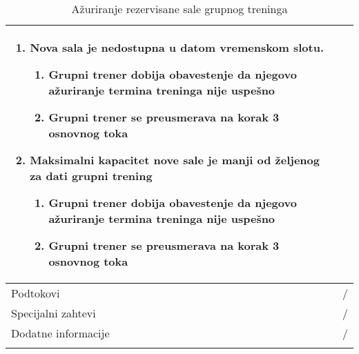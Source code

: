 \documentclass[../grupniTreninzi.tex]{subfiles}
\begin{document}
\begin{longtable}{| p{} | p{} |}
\begin{enumerate}
        \item Nova sala je nedostupna u datom vremenskom slotu. 
            \begin{enumerate}
                \item Grupni trener dobija obavestenje da njegovo ažuriranje termina treninga nije uspešno
                \item Grupni trener se preusmerava na korak 3 osnovnog toka
            \end{enumerate}
        \item Maksimalni kapacitet nove sale je manji od željenog za dati grupni trening
            \begin{enumerate}
                \item Grupni trener dobija obavestenje da njegovo ažuriranje termina treninga nije uspešno
                \item Grupni trener se preusmerava na korak 3 osnovnog toka
            \end{enumerate}
    \end{enumerate}\\
\hline
    Podtokovi & /\\
\hline
    Specijalni zahtevi & /\\
\hline
    Dodatne informacije & /\\
\hline
\caption{Ažuriranje rezervisane sale grupnog treninga} %
\end{longtable}
\end{document}
